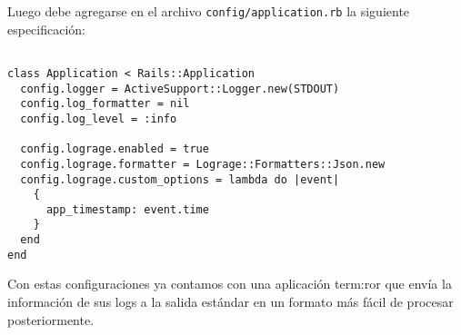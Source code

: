 Luego debe agregarse en el archivo \texttt{config/application.rb} la siguiente
especificación:

\begin{lstlisting}

class Application < Rails::Application
  config.logger = ActiveSupport::Logger.new(STDOUT)
  config.log_formatter = nil
  config.log_level = :info

  config.lograge.enabled = true
  config.lograge.formatter = Lograge::Formatters::Json.new
  config.lograge.custom_options = lambda do |event|
    {
      app_timestamp: event.time
    }
  end
end

\end{lstlisting}

Con estas configuraciones ya contamos con una aplicación \gls{term:ror} que
envía la información de sus logs a la salida estándar en un formato más fácil
de procesar posteriormente.
